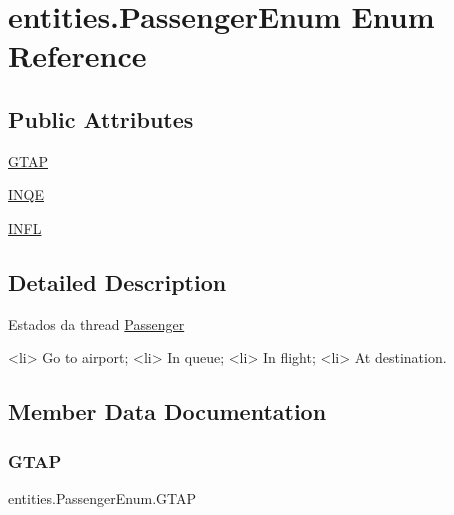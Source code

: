 \hypertarget{enumentities_1_1_passenger_enum}{}\section{entities.\+Passenger\+Enum Enum Reference}
\label{enumentities_1_1_passenger_enum}
\subsection*{Public Attributes}
\begin{DoxyCompactItemize}
\item 
\hyperlink{enumentities_1_1_passenger_enum_ab82aeb5b9c67246e82f69ba14e936a22}{G\+T\+AP}
\item 
\hyperlink{enumentities_1_1_passenger_enum_a25ddab644876bff4f8aa3698c3387f64}{I\+N\+QE}
\item 
\hyperlink{enumentities_1_1_passenger_enum_aad6e7d7674cf50860d2a6cd6b972c37f}{I\+N\+FL}
\end{DoxyCompactItemize}


\subsection{Detailed Description}
Estados da thread \hyperlink{classentities_1_1_passenger}{Passenger} \begin{DoxyVerb}<li> Go to airport;
<li> In queue;
<li> In flight;
<li> At destination.\end{DoxyVerb}
 

\subsection{Member Data Documentation}
\mbox{\label{enumentities_1_1_passenger_enum_ab82aeb5b9c67246e82f69ba14e936a22}} 
\subsubsection{\texorpdfstring{G\+T\+AP}{GTAP}}
{\footnotesize\ttfamily entities.\+Passenger\+Enum.\+G\+T\+AP}

\mbox{\label{enumentities_1_1_passenger_enum_aad6e7d7674cf50860d2a6cd6b972c37f}} 
